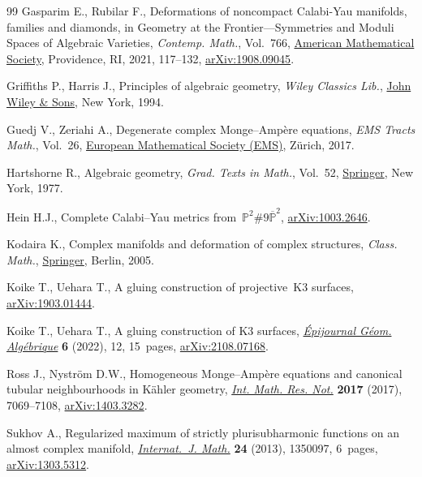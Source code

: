 \documentclass[pdftex]{sigma}
\numberwithin{equation}{section}
\begin{document}
\begin{thebibliography}{99}
Gasparim E., Rubilar F., Deformations of noncompact {C}alabi-{Y}au manifolds,
 families and diamonds, in Geometry at the {F}rontier---{S}ymmetries and
 {M}oduli {S}paces of {A}lgebraic {V}arieties, \textit{Contemp. Math.}, Vol.~766, \href{https://doi.org/10.1090/conm/766/15378}{American Mathematical
 Society}, Providence, RI, 2021, 117--132,
 \href{http://arxiv.org/abs/1908.09045}{arXiv:1908.09045}.

Griffiths P., Harris J., Principles of algebraic geometry, \textit{Wiley Classics Lib.},
 \href{https://doi.org/10.1002/9781118032527}{John Wiley \& Sons}, New York,
 1994.

Guedj V., Zeriahi A., Degenerate complex {M}onge--{A}mp\`ere equations,
 \textit{EMS Tracts Math.}, Vol.~26,
 \href{https://doi.org/10.4171/167}{European Mathematical Society (EMS)},
 Z\"urich, 2017.

Hartshorne R., Algebraic geometry, \textit{Grad. Texts in Math.}, Vol.~52,
 \href{https://doi.org/10.1007/978-1-4757-3849-0}{Springer}, New York, 1977.

Hein H.J., Complete Calabi--Yau metrics
 from~$\mathbb{P}^2\#9\overline{\mathbb{P}}^2$,
 \href{http://arxiv.org/abs/1003.2646}{arXiv:1003.2646}.

Kodaira K., Complex manifolds and deformation of complex structures, \textit{Class.
 Math.}, \href{https://doi.org/10.1007/b138372}{Springer}, Berlin, 2005.

Koike T., Uehara T., A gluing construction of projective~{K}3 surfaces,
 \href{http://arxiv.org/abs/1903.01444}{arXiv:1903.01444}.

Koike T., Uehara T., A gluing construction of {K}3 surfaces,
 \href{https://doi.org/10.46298/epiga.2022.volume6.8504}{\textit{\'Epijournal
 G\'eom. Alg\'ebrique}} \textbf{6} (2022), 12, 15~pages,
 \href{http://arxiv.org/abs/2108.07168}{arXiv:2108.07168}.

Ross J., Nystr\"om D.W., Homogeneous {M}onge--{A}mp\`ere equations and
 canonical tubular neighbourhoods in {K}\"ahler geometry,
 \href{https://doi.org/10.1093/imrn/rnw200}{\textit{Int. Math. Res. Not.}}
 \textbf{2017} (2017), 7069--7108,
 \href{http://arxiv.org/abs/1403.3282}{arXiv:1403.3282}.

Sukhov A., Regularized maximum of strictly plurisubharmonic functions on an
 almost complex manifold,
 \href{https://doi.org/10.1142/S0129167X13500973}{\textit{Internat.~J. Math.}}
 \textbf{24} (2013), 1350097, 6~pages,
 \href{http://arxiv.org/abs/1303.5312}{arXiv:1303.5312}.


\end{thebibliography}
\end{document}
